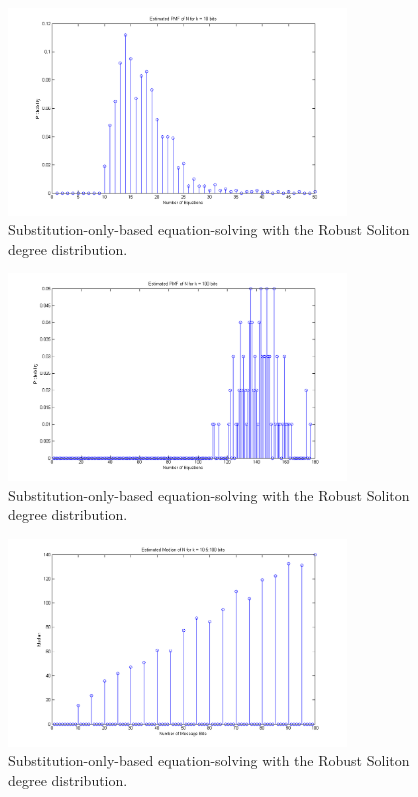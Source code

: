 \documentclass[11pt]{article}
\begin{document}
\begin{enumerate}
    \begin{figure}[H]
        \begin{center}
            \includegraphics[width = 0.8\textwidth]{figure_1c_k10_robust.png}
            \caption{Substitution-only-based equation-solving with the Robust Soliton degree distribution.}
        \end{center}
    \end{figure}

    \begin{figure}[H]
        \begin{center}
            \includegraphics[width = 0.8\textwidth]{figure_1c_k100_robust.png}
            \caption{Substitution-only-based equation-solving with the Robust Soliton degree distribution.}
        \end{center}
    \end{figure}

    \begin{figure}[H]
        \begin{center}
            \includegraphics[width = 0.8\textwidth]{figure_1c_median_robust.png}
            \caption{Substitution-only-based equation-solving with the Robust Soliton degree distribution.}
        \end{center}
    \end{figure}


\end{enumerate}
\end{document}
